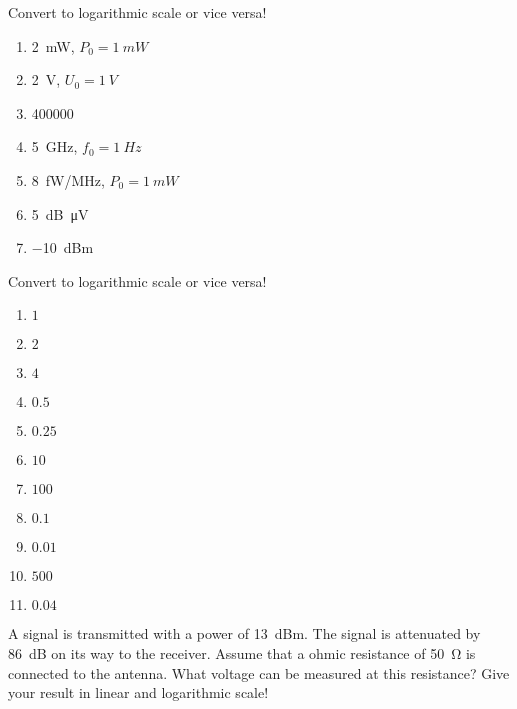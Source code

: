 \begin{question}[subtitle={Decibel}]
	\begin{tasks}
		\task
		Convert to logarithmic scale or vice versa!
		\begin{enumerate}
			\item \SI{2}{mW}, $P_0 = \SI{1}{mW}$
			\item \SI{2}{V}, $U_0 = \SI{1}{V}$
			\item \num{400000}
			\item \SI{5}{GHz}, $f_0 = \SI{1}{Hz}$
			\item \SI{8}{fW/MHz}, $P_0 = \SI{1}{mW}$
			\item \SI{5}{dB\micro\volt}
			\item \SI{-10}{dBm}
		\end{enumerate}
	
		\task
		Convert to logarithmic scale or vice versa!
		\begin{enumerate}
			\item $1$
			\item $2$
			\item $4$
			\item $0.5$
			\item $0.25$
			\item $10$
			\item $100$
			\item $0.1$
			\item $0.01$
			\item $500$
			\item $0.04$
		\end{enumerate}
	
		\task
		A signal is transmitted with a power of \SI{13}{dBm}. The signal is attenuated by \SI{86}{dB} on its way to the receiver. Assume that a ohmic resistance of \SI{50}{\ohm} is connected to the antenna. What voltage can be measured at this resistance? Give your result in linear and logarithmic scale!
	\end{tasks}
\end{question}

